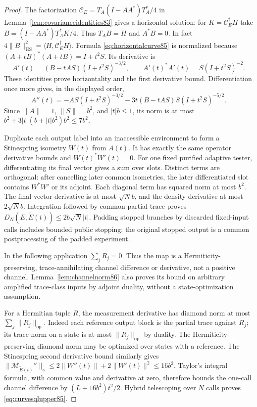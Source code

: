 \begin{proof}
The factorization
$\mathcal C_E=T_A(I-AA^*)T_A^*/4$ in
Lemma~\ref{lem:covarianceidentities83} gives a horizontal solution:
for $K=\mathcal C_E^\dagger H$ take
$B=(I-AA^*)T_A^*K/4$.  Thus $T_AB=H$ and $A^*B=0$.
In fact $4\|B\|_{\mathrm{HS}}^2=
\langle H,\mathcal C_E^\dagger H\rangle$.
Formula \eqref{eq:horizontalcurve85} is normalized because
$(A+tB)^*(A+tB)=I+t^2S$.  Its derivative is
\[
 A'(t)=(B-tAS)(I+t^2S)^{-3/2},\qquad
 A'(t)^*A'(t)=S(I+t^2S)^{-2}.
\]
These identities prove horizontality and the first derivative bound.
Differentiation once more gives, in the displayed order,
\[
 A''(t)=-AS(I+t^2S)^{-3/2}
       -3t(B-tAS)S(I+t^2S)^{-5/2}.
\]
Since $\|A\|=1$, $\|S\|=b^2$, and $|t|b\le1$, its norm is at
most $b^2+3|t|(b+|t|b^2)b^2\le7b^2$.

Duplicate each output label into an inaccessible environment to form
a Stinespring isometry $W(t)$ from $A(t)$.  It has exactly the same
operator derivative bounds and $W(t)^*W'(t)=0$.
For one fixed purified adaptive tester, differentiating its final
vector gives a sum over slots.  Distinct terms are orthogonal: after
cancelling later common isometries, the later differentiated slot
contains $W^*W'$ or its adjoint.  Each diagonal term has squared
norm at most $b^2$.  The final vector derivative is at most
$\sqrt N b$, and the density derivative at most $2\sqrt N b$.
Integration followed by common partial trace proves
$D_N(E,\widetilde E(t))\le2b\sqrt N|t|$.
Padding stopped branches by discarded fixed-input calls includes
bounded public stopping; the original stopped output is a common
postprocessing of the padded experiment.

In the following application $\sum_jR_j=0$.  Thus the map is a
Hermiticity-preserving, trace-annihilating channel difference or
derivative, not a positive channel.  Lemma~\ref{lem:channelnorm86}
also proves its bound on arbitrary amplified trace-class inputs by
adjoint duality, without a state-optimization assumption.

For a Hermitian tuple $R$, the measurement derivative has diamond norm
at most $\sum_j\|R_j\|_{\mathrm{op}}$.
Indeed each reference output block is the partial trace against $R_j$;
its trace norm on a state is at most $\|R_j\|_{\mathrm{op}}$ by
duality.  The Hermiticity-preserving diamond norm may be optimized
over states with a reference.  The Stinespring second derivative
bound similarly gives
$\|\mathcal M_{\widetilde E(t)}''\|_\diamond
\le2\|W''(t)\|+2\|W'(t)\|^2\le16b^2$.
Taylor's integral formula, with common value and derivative at zero,
therefore bounds the one-call channel difference by
$(L+16b^2)t^2/2$.  Hybrid telescoping over $N$ calls proves
\eqref{eq:curvesqlupper85}.
\end{proof}

